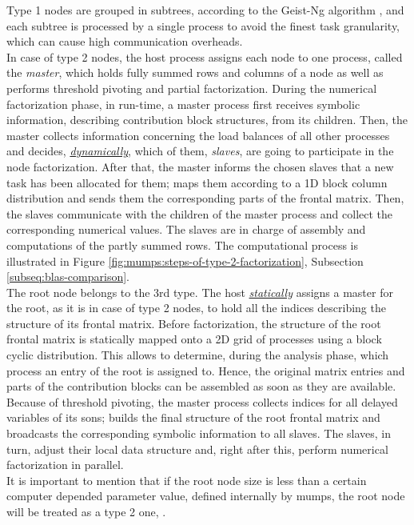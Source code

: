 Type 1 nodes are grouped in subtrees, according to the Geist-Ng algorithm \cite{geist1989task}, and each subtree is processed by a single process to avoid the finest task granularity, which can cause high communication overheads. \\


In case of type 2 nodes, the host process assigns each node to one process, called the \textit{master}, which holds fully summed rows and columns of a node as well as performs threshold pivoting and partial factorization. During the numerical factorization phase, in run-time, a master process first receives symbolic information, describing  contribution block structures, from its children. Then, the master collects information concerning the load balances of all other processes and decides, \underline{\textit{dynamically}},  which of them, \textit{slaves}, are going to participate in the node factorization. After that, the master informs the chosen slaves that a new task has been allocated for them; maps them according to a 1D block column distribution and sends them the corresponding parts of the frontal matrix. Then, the slaves communicate with  the children of the master process and collect the corresponding numerical values. The slaves are in charge of assembly and computations of the partly summed rows. The computational process is illustrated in Figure \ref{fig:mumps:steps-of-type-2-factorization}, Subsection \ref{subseq:blas-comparison}.\\


The root node belongs to the 3rd type. The host \underline{\textit{statically}} assigns a master for the root, as it is in case of type 2 nodes, to hold all the indices describing the structure of its frontal matrix. Before factorization, the structure of the root frontal matrix is statically mapped onto a 2D grid of processes using a block cyclic distribution. This allows to determine, during the analysis phase, which process an entry of the root is assigned to. Hence, the original matrix entries and parts of the contribution blocks can be assembled as soon as they are available. Because of threshold pivoting, the master process collects indices for all delayed variables of its sons; builds the final structure of the root frontal matrix and broadcasts the corresponding symbolic information to all slaves. The slaves, in turn, adjust their local data structure and, right after this, perform numerical factorization in parallel.\\


It is important to mention that if the root node size is less than a certain computer depended parameter value, defined internally by \acrshort{mumps}, the root node will be treated as a type 2 one, \cite{mumps-manual}.\\


